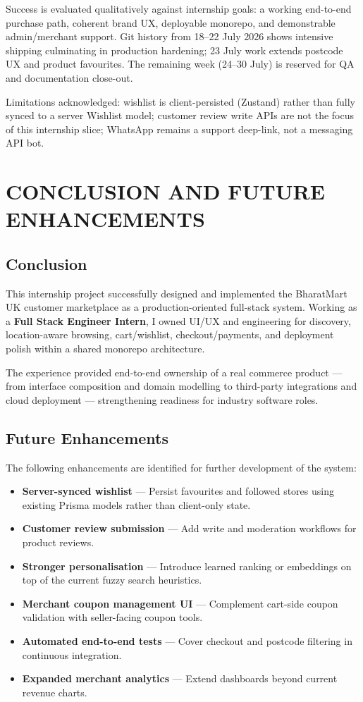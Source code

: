 \documentclass[12pt,a4paper]{report}
\begin{document}
Success is evaluated qualitatively against internship goals: a working
end-to-end purchase path, coherent brand UX, deployable monorepo, and
demonstrable admin/merchant support. Git history from 18--22 July 2026 shows
intensive shipping culminating in production hardening; 23 July work extends
postcode UX and product favourites. The remaining week (24--30 July) is
reserved for QA and documentation close-out.

Limitations acknowledged: wishlist is client-persisted (Zustand) rather than
fully synced to a server Wishlist model; customer review write APIs are not
the focus of this internship slice; WhatsApp remains a support deep-link, not
a messaging API bot.


\chapter{CONCLUSION AND FUTURE ENHANCEMENTS}

\section{Conclusion}

This internship project successfully designed and implemented the BharatMart UK
customer marketplace as a production-oriented full-stack system. Working as a
\textbf{Full Stack Engineer Intern}, I owned UI/UX and engineering for
discovery, location-aware browsing, cart/wishlist, checkout/payments, and
deployment polish within a shared monorepo architecture.

The experience provided end-to-end ownership of a real commerce product ---
from interface composition and domain modelling to third-party integrations and
cloud deployment --- strengthening readiness for industry software roles.


\section{Future Enhancements}

The following enhancements are identified for further development of the
system:

\begin{itemize}
    \item \textbf{Server-synced wishlist} --- Persist favourites and followed
    stores using existing Prisma models rather than client-only state.
    \item \textbf{Customer review submission} --- Add write and moderation
    workflows for product reviews.
    \item \textbf{Stronger personalisation} --- Introduce learned ranking or
    embeddings on top of the current fuzzy search heuristics.
    \item \textbf{Merchant coupon management UI} --- Complement cart-side
    coupon validation with seller-facing coupon tools.
    \item \textbf{Automated end-to-end tests} --- Cover checkout and postcode
    filtering in continuous integration.
    \item \textbf{Expanded merchant analytics} --- Extend dashboards beyond
    current revenue charts.
\end{itemize}
\end{document}
